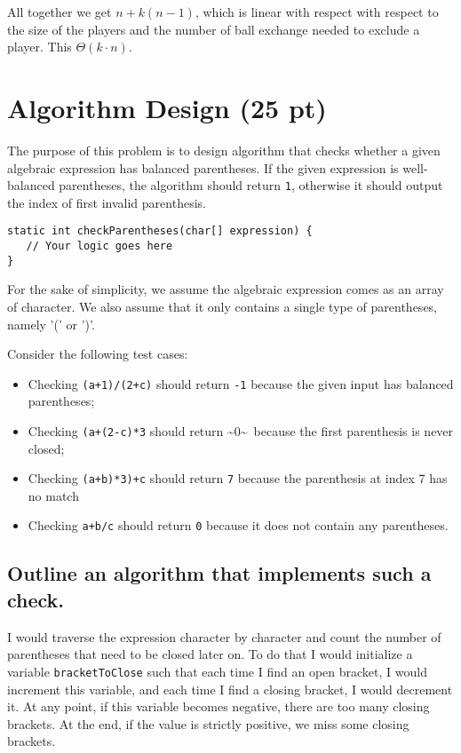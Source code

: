 \documentclass[11pt]{article}
\begin{document}
All together we get \(n + k(n - 1)\), which is linear with respect
with respect to the size of the players and the number of ball
exchange needed to exclude a player. This \(\Theta(k \cdot n)\).


\section{Algorithm Design (25 pt)}
\label{sec:orga009949}

The purpose of this problem is to design algorithm that checks
whether a given algebraic expression has balanced parentheses. If
the given expression is well-balanced parentheses, the algorithm
should return \texttt{1}, otherwise it should output the index of first
invalid parenthesis.

\begin{verbatim}
static int checkParentheses(char[] expression) {
   // Your logic goes here
}
\end{verbatim}

For the sake of simplicity, we assume the algebraic expression comes
as an array of character. We also assume that it only contains a
single type of parentheses, namely '(' or ')'.

Consider the following test cases:
\begin{itemize}
\item Checking \texttt{(a+1)/(2+c)} should return \texttt{-1} because the given input
has balanced parentheses;
\item Checking \texttt{(a+(2-c)*3} should return \textasciitilde{}0\textasciitilde{} because the first
parenthesis is never closed;
\item Checking \texttt{(a+b)*3)+c} should return \texttt{7} because the parenthesis
at index 7 has no match
\item Checking \texttt{a+b/c} should return \texttt{0} because it does not contain
any parentheses.
\end{itemize}

\subsection{Outline an algorithm that implements such a check.}
\label{sec:org71bd6c5}

I would traverse the expression character by character and count
the number of parentheses that need to be closed later on. To do
that I would initialize a variable \texttt{bracketToClose} such that each time
I find an open bracket, I would increment this variable, and each
time I find a closing bracket, I would decrement it. At any
point, if this variable becomes negative, there are too many
closing brackets. At the end, if the value is strictly positive,
we miss some closing brackets.
\end{document}
